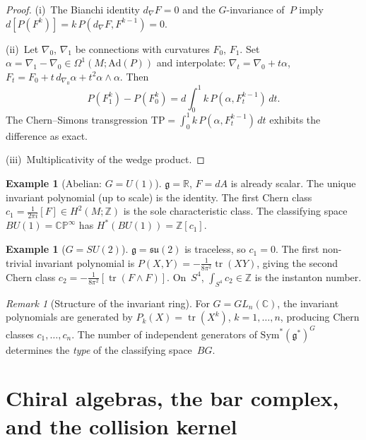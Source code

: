 \documentclass[11pt,reqno]{amsart}
\theoremstyle{definition}
\newtheorem{example}[theorem]{Example}
\theoremstyle{remark}
\newtheorem{remark}[theorem]{Remark}
\newcommand{\fg}{\mathfrak{g}}
\newcommand{\Sym}{\mathrm{Sym}}
\newcommand{\Ad}{\mathrm{Ad}}
\DeclareMathOperator{\tr}{tr}
\numberwithin{equation}{section}
\begin{document}
\begin{proof}
(i)~The Bianchi identity $d_\nabla F = 0$ and the
$G$-invariance of~$P$ imply
$d[P(F^k)] = k\,P(d_\nabla F, F^{k-1}) = 0$.

\smallskip\noindent
(ii)~Let $\nabla_0$, $\nabla_1$ be connections with curvatures
$F_0$, $F_1$. Set $\alpha = \nabla_1 - \nabla_0 \in
\Omega^1(M;\Ad(P))$ and interpolate:
$\nabla_t = \nabla_0 + t\alpha$,
$F_t = F_0 + t\,d_{\nabla_0}\alpha + t^2\alpha\wedge\alpha$.
Then
\[
P(F_1^k) - P(F_0^k) = d\!\int_0^1 k\,P(\alpha, F_t^{k-1})\,dt.
\]
The Chern--Simons transgression
$\mathrm{TP} = \int_0^1 k\,P(\alpha, F_t^{k-1})\,dt$
exhibits the difference as exact.

\smallskip\noindent
(iii)~Multiplicativity of the wedge product.
\end{proof}

\begin{example}[Abelian: $G = U(1)$]\label{ex:u1}
$\fg = \mathbb{R}$, $F = dA$ is already scalar. The unique
invariant polynomial (up to scale) is the identity. The first
Chern class $c_1 = \frac{1}{2\pi i}[F] \in H^2(M;\mathbb{Z})$
is the sole characteristic class.
The classifying space $BU(1) = \mathbb{CP}^\infty$ has
$H^*(BU(1)) = \mathbb{Z}[c_1]$.
\end{example}

\begin{example}[$G = SU(2)$]\label{ex:su2}
$\fg = \mathfrak{su}(2)$ is traceless, so $c_1 = 0$.
The first non-trivial invariant polynomial is
$P(X,Y) = -\frac{1}{8\pi^2}\tr(XY)$, giving the
second Chern class $c_2 = -\frac{1}{8\pi^2}[\tr(F\wedge F)]$.
On~$S^4$, $\int_{S^4}c_2 \in \mathbb{Z}$ is the instanton
number.
\end{example}

\begin{remark}[Structure of the invariant ring]\label{rem:type}
For $G = GL_n(\mathbb{C})$, the invariant polynomials are
generated by $P_k(X) = \tr(X^k)$, $k = 1,\ldots,n$, producing
Chern classes $c_1,\ldots,c_n$. The number of independent
generators of $\Sym^*(\fg^*)^G$ determines the \emph{type} of
the classifying space~$BG$.
\end{remark}


\section{Chiral algebras, the bar complex, and the
collision kernel}\label{sec:chiral}
\end{document}
